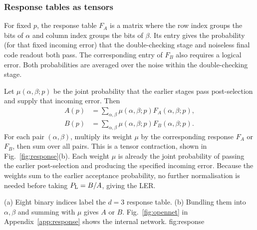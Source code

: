 \subsubsection{Response tables as tensors}
For fixed $p$, the response table $F_A$ is a matrix where the row
index groups the bits of $\alpha$ and column index
groups the bits of $\beta$. Its entry gives the probability (for
that fixed incoming error) that the double-checking stage and noiseless final code readout both pass. The corresponding entry of $F_B$ also requires
a logical error. Both probabilities are averaged over the noise within the
double-checking stage.

Let $\mu(\alpha,\beta;p)$ be the joint probability that the earlier
stages pass post-selection and supply that incoming error. Then
\begin{equation}
 \begin{aligned}
 A(p)&=\sum_{\alpha,\beta}\mu(\alpha,\beta;p)F_A(\alpha,\beta;p),\\
 B(p)&=\sum_{\alpha,\beta}\mu(\alpha,\beta;p)F_B(\alpha,\beta;p).
 \end{aligned}
 \label{eq:responseaverage}
\end{equation}
For each pair $(\alpha,\beta)$, multiply its weight $\mu$
by the corresponding response $F_A$ or $F_B$, then sum over all pairs.
This is a tensor contraction, shown in Fig.~\ref{fig:response}(b).
Each weight $\mu$ is already the joint probability of passing the earlier post-selection and producing
the specified incoming error. Because the weights sum to the earlier acceptance probability, no further normalisation is needed before taking $P_{\mathrm L}=B/A$, giving the LER.

{(a) Eight binary indices label the $d=3$ response table.
(b) Bundling them into $\alpha,\beta$ and summing with $\mu$ gives $A$ or $B$.
Fig.~\ref{fig:opennet} in Appendix~\ref{app:response}
shows the internal network.}
{fig:response}

